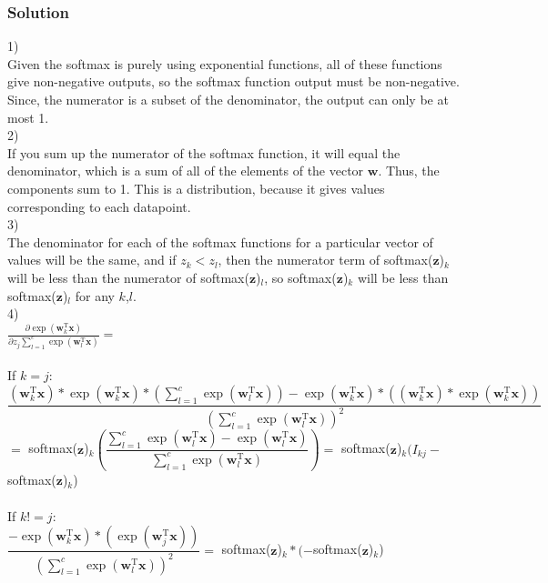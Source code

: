 \documentclass[submit]{harvardml}
\begin{document}
\subsubsection*{Solution}
1)\\
Given the softmax is purely using exponential functions, all of these functions give non-negative outputs, so the softmax function output must be non-negative.  Since, the numerator is a subset of the denominator, the output can only be at most 1.\\
2)\\
If you sum up the numerator of the softmax function, it will equal the denominator, which is a sum of all of the elements of the vector $\textbf{w}$.  Thus, the components sum to 1.  This is a distribution, because it gives values corresponding to each datapoint.\\
3)\\
The denominator for each of the softmax functions for a particular vector of values will be the same, and if $z_k < z_l$, then the numerator term of softmax($\textbf{z}$)$_k$ will be less than the numerator of softmax($\textbf{z}$)$_l$, so softmax($\textbf{z}$)$_k$ will be less than softmax($\textbf{z}$)$_l$ for any $k$,$l$.\\
4)\\
$\frac{\partial \exp{(\textbf{w}_k^{\textrm{T}}\textbf{x})}}{\partial z_j\sum_{l=1}^{c}\exp{(\textbf{w}_l^{\textrm{T}}\textbf{x})}} =$ \\
\\
If $k=j$:\\
$\dfrac{(\textbf{w}_k^{\textrm{T}}\textbf{x})*\exp{(\textbf{w}_k^{\textrm{T}}\textbf{x})}*(\sum_{l=1}^{c}\exp{(\textbf{w}_l^{\textrm{T}}\textbf{x})})-\exp{(\textbf{w}_k^{\textrm{T}}\textbf{x})}*((\textbf{w}_k^{\textrm{T}}\textbf{x})*\exp{(\textbf{w}_k^{\textrm{T}}\textbf{x})})}{(\sum_{l=1}^{c}\exp{(\textbf{w}_l^{\textrm{T}}\textbf{x})})^2}$\\
$=$ softmax($\textbf{z}$)$_k(\dfrac{\sum_{l=1}^{c}\exp{(\textbf{w}_l^{\textrm{T}}\textbf{x})}-\exp{(\textbf{w}_l^{\textrm{T}}\textbf{x})}}{\sum_{l=1}^{c}\exp{(\textbf{w}_l^{\textrm{T}}\textbf{x})}})=$ softmax($\textbf{z}$)$_k(I_{kj}-$softmax($\textbf{z}$)$_k$)\\
\\
If $k !=j$:\\
$\dfrac{-\exp{(\textbf{w}_k^{\textrm{T}}\textbf{x})}*(\exp{(\textbf{w}_j^{\textrm{T}}\textbf{x})})}{(\sum_{l=1}^{c}\exp{(\textbf{w}_l^{\textrm{T}}\textbf{x})})^2}=$ softmax($\textbf{z}$)$_k*(-$softmax($\textbf{z}$)$_k$)
\end{document}
